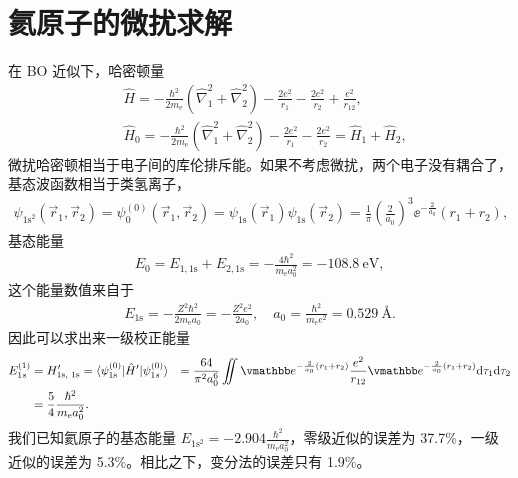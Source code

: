 \section{氦原子的微扰求解}
在 BO 近似下，哈密顿量
\begin{align}
    &\hat H = -\frac{\hbar^2}{2m_{\mathrm e}} \left(\hat\nabla_1^2 + \hat \nabla_2^2\right) - \frac{2e^2}{r_1} - \frac{2e^2}{r_2} + \frac{e^2}{r_{12}}, \\
    &\hat H_0 = -\frac{\hbar^2}{2m_{\mathrm e}} \left(\hat\nabla_1^2 + \hat \nabla_2^2\right) - \frac{2e^2}{r_1} - \frac{2e^2}{r_2} = \hat H_1 + \hat H_2, 
\end{align}
微扰哈密顿相当于电子间的库伦排斥能。如果不考虑微扰，两个电子没有耦合了，基态波函数相当于类氢离子，
\begin{align}
    \psi_{\text{1s}^2}(\vec r_1, \vec r_2) = \psi_0^{(0)} (\vec r_1, \vec r_2) = \psi_{\text{1s}}(\vec r_1) \psi_{\text{1s}}(\vec r_2) = \frac{1}{\pi} \left(\frac2{a_0}\right)^3 \ee^{-\frac2{a_0}}(r_1 + r_2), 
\end{align}
基态能量
\begin{align}
    E_0 = E_{1,\text{1s}} + E_{2, \text{1s}} = -\frac{4\hbar^2}{m_{\mathrm e}a_0^2} = \SI{-108.8}{\electronvolt}, 
\end{align}
这个能量数值来自于
\begin{align}
    E_{\text{1s}} = - \frac{Z^2\hbar^2}{2m_{\mathrm{e}}a_0} = - \frac{Z^2e^2}{2a_0}, \quad a_0= \frac{\hbar^2}{m_\mathrm{e}e^2} = \SI{0.529}{\angstrom}. 
\end{align}
因此可以求出来一级校正能量
\begin{align}
    E_{1s}^{(1)} &= H'_{\text{1s, 1s}} = \langle \psi_{\mathrm{1s}}^{(0)} | \hat H' | \psi_{1s}^{(0)} \rangle 
    &= \frac{64}{\pi^2a_0^6} \iint \ee^{-\frac2{a_0}(r_1 + r_2)} \frac{e^2}{r_{12}} \ee^{-\frac2{a_0}(r_1+r_2)}\dd\tau_1 \dd\tau_2 \notag \\
    &= \frac54 \frac{\hbar^2}{m_\mathrm{e}a_0^2}. 
\end{align}
我们已知氦原子的基态能量 $E_{\mathrm{1s^2}} = -2.904\frac{\hbar^2}{m_{\mathrm e}a_0^2}$，零级近似的误差为 37.7\%，一级近似的误差为 5.3\%。相比之下，变分法的误差只有 1.9\%。
